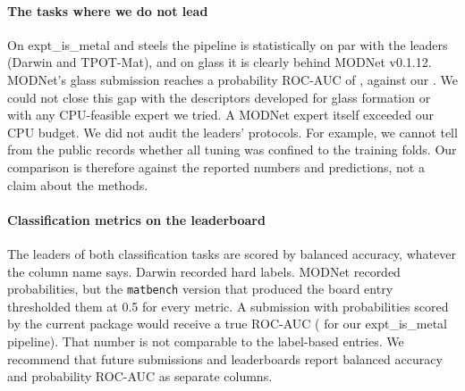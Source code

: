 \paragraph{The tasks where we do not lead}
On expt\_is\_metal and steels the pipeline is statistically on par with the leaders (Darwin and TPOT-Mat), and on glass it is clearly behind MODNet v0.1.12.
MODNet's glass submission reaches a probability ROC-AUC of \AtwoLeaderAUCGlass, against our \AtwoAUCGlass{}. We could not close this gap with the descriptors developed for glass formation or with any CPU-feasible expert we tried. A MODNet expert itself exceeded our CPU budget.
We did not audit the leaders' protocols. For example, we cannot tell from the public records whether all tuning was confined to the training folds. Our comparison is therefore against the reported numbers and predictions, not a claim about the methods.

\paragraph{Classification metrics on the leaderboard}
The leaders of both classification tasks are scored by balanced accuracy, whatever the column name says. Darwin recorded hard labels. MODNet recorded probabilities, but the \texttt{matbench} version that produced the board entry thresholded them at 0.5 for every metric.
A submission with probabilities scored by the current package would receive a true ROC-AUC (\AtwoAUCMetal{} for our expt\_is\_metal pipeline). That number is not comparable to the label-based entries.
We recommend that future submissions and leaderboards report balanced accuracy and probability ROC-AUC as separate columns.

